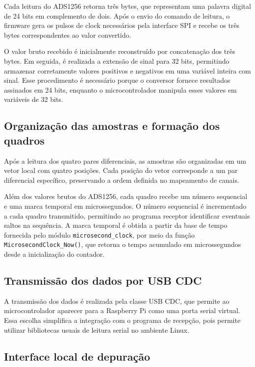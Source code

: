\documentclass[a4paper,12pt]{fcte}
\begin{document}
Cada leitura do ADS1256 retorna três bytes, que representam uma palavra digital de 24 bits em complemento de dois. Após o envio do comando de leitura, o firmware gera os pulsos de clock necessários pela interface SPI e recebe os três bytes correspondentes ao valor convertido.

O valor bruto recebido é inicialmente reconstruído por concatenação dos três bytes. Em seguida, é realizada a extensão de sinal para 32 bits, permitindo armazenar corretamente valores positivos e negativos em uma variável inteira com sinal. Esse procedimento é necessário porque o conversor fornece resultados assinados em 24 bits, enquanto o microcontrolador manipula esses valores em variáveis de 32 bits.

\subsection{Organização das amostras e formação dos quadros}
\label{subsec:organizacao_quadros_firmware}

Após a leitura dos quatro pares diferenciais, as amostras são organizadas em um vetor local com quatro posições. Cada posição do vetor corresponde a um par diferencial específico, preservando a ordem definida no mapeamento de canais.

Além dos valores brutos do ADS1256, cada quadro recebe um número sequencial e uma marca temporal em microssegundos. O número sequencial é incrementado a cada quadro transmitido, permitindo ao programa receptor identificar eventuais saltos na sequência. A marca temporal é obtida a partir da base de tempo fornecida pelo módulo \texttt{microsecond\_clock}, por meio da função \texttt{MicrosecondClock\_Now()}, que retorna o tempo acumulado em microssegundos desde a inicialização do contador.

\subsection{Transmissão dos dados por USB CDC}
\label{subsec:transmissao_usb_cdc}

A transmissão dos dados é realizada pela classe USB CDC, que permite ao microcontrolador aparecer para a Raspberry Pi como uma porta serial virtual. Essa escolha simplifica a integração com o programa de recepção, pois permite utilizar bibliotecas usuais de leitura serial no ambiente Linux.

\subsection{Interface local de depuração}
\label{subsec:interface_depuracao_firmware}
\end{document}
